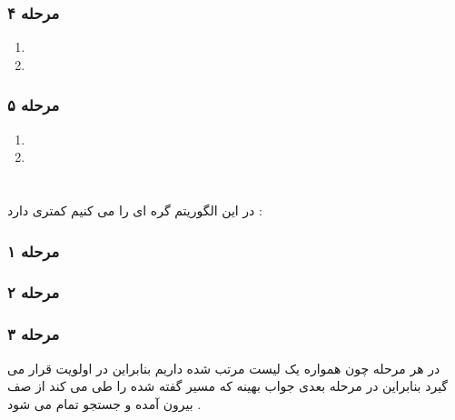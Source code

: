 \documentclass{article}
\begin{document}
\subsubsection*{مرحله ۴ }
\begin{center}
	\begin{enumerate}
		\item  {}
		\item  {}
	\end{enumerate}
\end{center}
\subsubsection*{مرحله ۵ }
\begin{center}
	\begin{enumerate}
		\item  {}
		\item  {}
	\end{enumerate}
\end{center}
\section*{\textcolor{red}{}}
در این الگوریتم گره ای را 
می کنیم 
کمتری دارد  : 
\subsubsection*{مرحله ۱ }
\begin{center}
\end{center}
\subsubsection*{مرحله ۲ }
\begin{center}
\end{center}
\subsubsection*{مرحله ۳ }
\begin{center}
\end{center}
در هر مرحله چون همواره یک لیست مرتب شده داریم بنابراین 
\lr{[S -> A -> D -> G , 7]}
در اولویت قرار می گیرد بنابراین در مرحله بعدی جواب بهینه که مسیر گفته شده را طی می کند از صف بیرون آمده و جستجو تمام می شود . 
\end{document}
